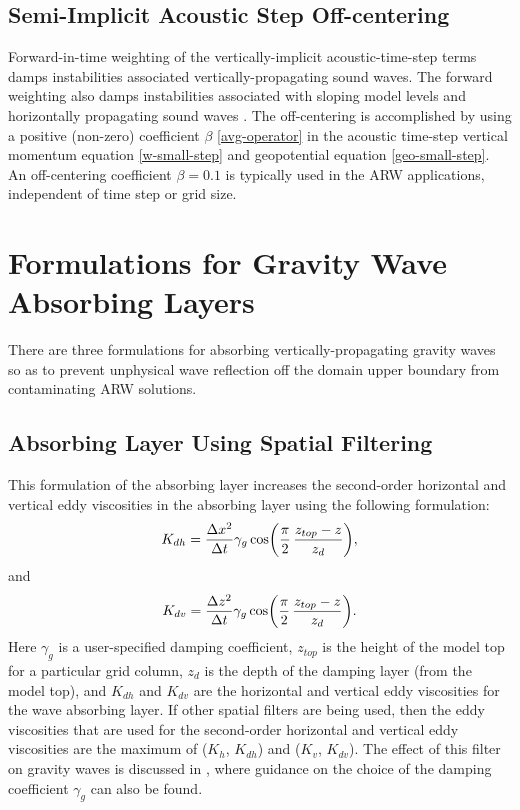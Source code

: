 \subsection{Semi-Implicit Acoustic Step Off-centering}
\label{offcentering}

Forward-in-time weighting of the vertically-implicit
acoustic-time-step terms damps instabilities associated
vertically-propagating sound waves.  The forward weighting also damps
instabilities associated with sloping model levels and horizontally
propagating sound waves
\citep[see][]{durran_klemp83, dudhia95}.  The off-centering
is accomplished by using a positive (non-zero) coefficient $\beta$
\eqref{avg-operator} in the acoustic time-step vertical momentum
equation \eqref{w-small-step} and geopotential equation
\eqref{geo-small-step}.  An off-centering coefficient $\beta = 0.1$ is
typically used in the ARW applications, independent of time step or
grid size.

\section{Formulations for Gravity Wave Absorbing Layers}

There are three formulations for absorbing vertically-propagating
gravity waves so as to prevent unphysical wave reflection off the
domain upper boundary from contaminating ARW solutions.

\subsection{Absorbing Layer Using Spatial Filtering}
\label{absorbing_layer_spatial}

This formulation of the absorbing layer increases the second-order
horizontal and vertical eddy viscosities in the absorbing layer using
the following formulation:
%
\begin{equation}
K_{dh} = {\Delta x^2\over \Delta t} \gamma_g
\cos \biggl({\pi \over 2} \,{z_{top} - z \over z_{d}} \biggr),
\notag
\end{equation}
%
\noindent
and
%
\begin{equation}
K_{dv} = {\Delta z^2\over \Delta t} \gamma_g
\cos \biggl({\pi \over 2} \, {z_{top} - z \over z_{d}} \biggr).
\notag
\end{equation}
%
\noindent
Here $\gamma_g$ is a user-specified damping coefficient, $z_{top}$
is the height of the model top for a particular grid column, 
$z_d$ is the depth of the damping layer (from the model top), 
and $K_{dh}$ and $K_{dv}$ are the horizontal and vertical 
eddy viscosities for the wave absorbing layer.  If other 
spatial filters are being used, then the eddy viscosities
that are used for the second-order horizontal and vertical
eddy viscosities are the
maximum of ($K_h$, $K_{dh}$) and ($K_v$, $K_{dv}$).
The effect of this filter on gravity waves is discussed in
\citet{klemp_and_lilly78}, where guidance on the choice of 
the damping coefficient $\gamma_g$ can also be found.

